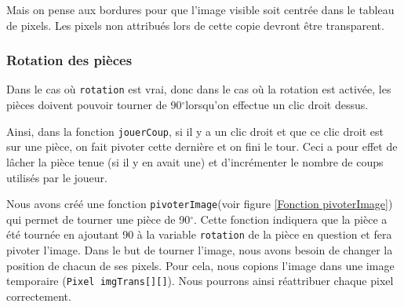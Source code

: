 \documentclass[]{article}
\newcommand{\variable}[1]{\noindent \texttt{#1}}
\newcommand{\degr}[0]{$^\circ$}
\begin{document}
Mais on pense aux bordures pour que l'image visible soit centrée dans le tableau de pixels. Les pixels non attribués lors de cette copie devront être transparent.

\subsubsection{Rotation des pièces}

Dans le cas où \variable{rotation} est vrai, donc dans le cas où la rotation est activée, les pièces doivent pouvoir tourner de 90\degr lorsqu'on effectue un clic droit dessus.

Ainsi, dans la fonction \variable{jouerCoup}, si il y a un clic droit et que ce clic droit est sur une pièce, on fait pivoter cette dernière et on fini le tour. Ceci a pour effet de lâcher la pièce tenue (si il y en avait une) et d'incrémenter le nombre de coups utilisés par le joueur.

Nous avons créé une fonction \variable{pivoterImage}(voir figure \no\ref{Fonction pivoterImage}) qui permet de tourner une pièce de 90\degr. Cette fonction indiquera que la pièce a été tournée en ajoutant 90 à la variable \variable{rotation} de la pièce en question et fera pivoter l'image. Dans le but de tourner l'image, nous avons besoin de changer la position de chacun de ses pixels. Pour cela, nous copions l'image dans une image temporaire (\variable{Pixel imgTrans[][]}). Nous pourrons ainsi réattribuer chaque pixel correctement.
\end{document}
